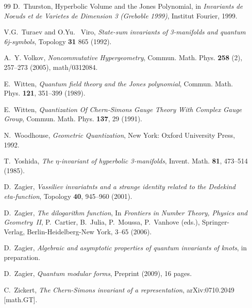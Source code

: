 \documentclass[hyper]{JHEP3}
\begin{document}
\begin{thebibliography}{99}
D.~Thurston,
\newblock Hyperbolic Volume and the Jones Polynomial,
\newblock in \textsl{ Invariants de Noeuds et de Varietes de Dimension 3 (Greboble 1999)},
Institut Fourier, 1999.

V.G.~Turaev and O.Yu.~ Viro, \textsl{ State-sum invariants of 3-manifolds and quantum 6j-symbols},
\newblock Topology \textbf{ 31} 865 (1992).

A.~Y. Volkov, \textsl{ Noncommutative Hypergeometry},
\newblock Commun. Math. Phys. \textbf{ 258} (2), 257--273 (2005), {math/0312084}.

E.~Witten, \textsl{ Quantum field theory and the Jones polynomial},
\newblock Commun. Math. Phys. \textbf{ 121}, 351--399 (1989).

E.~Witten,
\textsl{ Quantization Of Chern-Simons Gauge Theory With Complex Gauge Group},
\newblock Commun. Math. Phys. \textbf{ 137}, 29 (1991).

N.~Woodhouse,
\newblock \textsl{ Geometric Quantization},
\newblock New York: Oxford University Press, 1992.

T.~Yoshida, \textsl{ The $\eta$-invariant of hyperbolic 3-manifolds},
\newblock Invent. Math. \textbf{ 81}, 473--514 (1985).


D.~Zagier, \textsl{Vassiliev invariatnts and a strange identity related
to the Dedekind eta-function},
\newblock Topology \textbf{40},  945--960 (2001).

D.~Zagier, \textsl{The dilogarithm function},
\newblock In {\it Frontiers in Number Theory, Physics and Geometry~II},
P.~Cartier, B.~Julia, P.~Moussa, P.~Vanhove (eds.),
  Springer-Verlag, Berlin-Heidelberg-New York, 3--65 (2006).


D.~Zagier, \textsl{Algebraic and asymptotic properties of quantum invariants of knots},
\newblock in preparation.

D.~Zagier, \textsl{ Quantum modular forms}, \newblock Preprint (2009), 16 pages.

C.~Zickert, \textsl{The Chern-Simons invariant of a representation}, \newblock arXiv:0710.2049 [math.GT].


\end{thebibliography}
\end{document}

